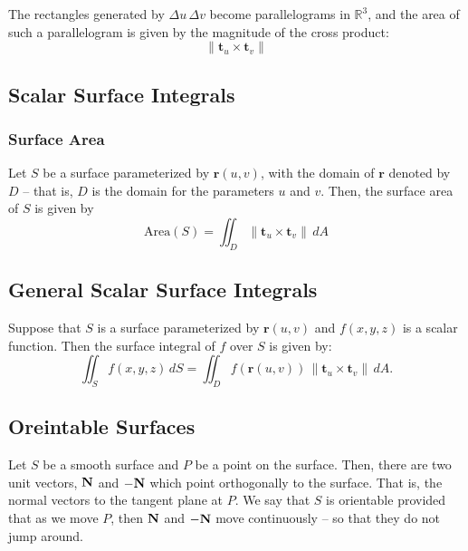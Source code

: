 The rectangles generated by \( \Delta u \, \Delta v \) become parallelograms in \( \mathbb{R}^3 \), and the area of such a parallelogram is given by the magnitude of the cross product:
\[
\| \mathbf{t}_u \times \mathbf{t}_v \|
\]

\subsection{Scalar Surface Integrals}

\subsubsection{Surface Area}

Let \( S \) be a surface parameterized by \( \mathbf{r}(u, v) \), with the domain of \( \mathbf{r} \) denoted by \( D \) – that is, \( D \) is the domain for the parameters \( u \) and \( v \). Then, the surface area of \( S \) is given by
\[
\text{Area}(S) = \iint_D \| \mathbf{t}_u \times \mathbf{t}_v \| \, dA
\]

\subsection{General Scalar Surface Integrals}

Suppose that \( S \) is a surface parameterized by \( \mathbf{r}(u, v) \) and \( f(x, y, z) \) is a scalar function. Then the surface integral of \( f \) over \( S \) is given by:
\[
\iint_S f(x, y, z) \, dS = \iint_D f(\mathbf{r}(u, v)) \, \| \mathbf{t}_u \times \mathbf{t}_v \| \, dA.
\]

\subsection{Oreintable Surfaces}

Let \(S\) be a smooth surface and \(P\) be a point on the surface. Then, there are two unit vectors, \(\mathbf{N}\) and \(-\mathbf{N}\) which point orthogonally to the surface. That is, the normal vectors to the tangent plane at \(P\). We say that \(S\) is orientable provided that as we move \(P\), then \(\mathbf{N}\) and \(-\mathbf{N}\) move continuously – so that they do not jump around. \\


